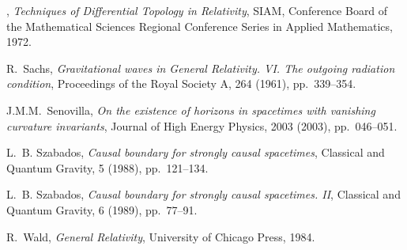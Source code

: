 \documentclass[11pt]{article}
\begin{document}
\begin{thebibliography}{10}
\leavevmode\vrule height 2pt depth -1.6pt width 23pt, {\em Techniques of
  {Differential} {Topology} in {{Relativity}}}, {{SIAM}}, {Conference Board of
  the Mathematical Sciences Regional Conference Series in Applied Mathematics},
  1972.

{\sc R.~Sachs}, {\em Gravitational waves in {{General}} {{Relativity.}}{{ VI}}.
  {{The}} outgoing radiation condition}, Proceedings of the Royal Society A,
  264 (1961), pp.~339--354.

{\sc J.M.M.~Senovilla}, {\em On the existence of horizons in spacetimes with
  vanishing curvature invariants}, Journal of High Energy Physics, 2003 (2003),
  pp.~046--051.

{\sc L.~B. Szabados}, {\em Causal boundary for strongly causal spacetimes},
  Classical and Quantum Gravity, 5 (1988), pp.~121--134.

{\sc L.~B. Szabados}, {\em Causal boundary for strongly causal spacetimes.
  {{II}}}, Classical and Quantum Gravity, 6 (1989), pp.~77--91.

{\sc R.~Wald}, {\em General {{Relativity}}}, {University of Chicago Press},
  1984.

\end{thebibliography}
\vspace*{\fill}


\vspace{.5cm}
\end{document}
